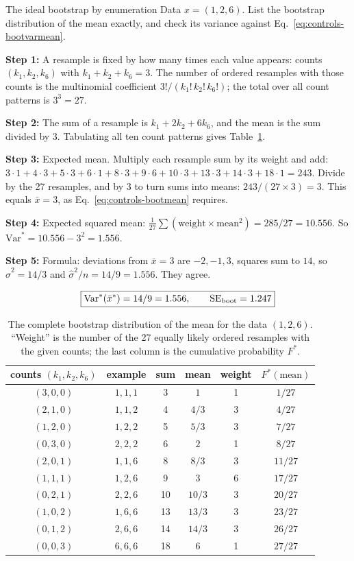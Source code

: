 \begin{sample}{The ideal bootstrap by enumeration}
Data $x=(1,2,6)$. List the bootstrap distribution of the mean exactly, and check its variance against Eq.~\eqref{eq:controls-bootvarmean}.

\textbf{Step 1:} A resample is fixed by how many times each value appears: counts $(k_1,k_2,k_6)$ with $k_1+k_2+k_6=3$. The number of ordered resamples with those counts is the multinomial coefficient $3!/(k_1!\,k_2!\,k_6!)$; the total over all count patterns is $3^3=27$.

\textbf{Step 2:} The sum of a resample is $k_1+2k_2+6k_6$, and the mean is the sum divided by 3. Tabulating all ten count patterns gives Table~\ref{tab:controls-enum}.

\textbf{Step 3:} Expected mean. Multiply each resample sum by its weight and add: $3\cdot1+4\cdot3+5\cdot3+6\cdot1+8\cdot3+9\cdot6+10\cdot3+13\cdot3+14\cdot3+18\cdot1=243$. Divide by the 27 resamples, and by 3 to turn sums into means: $243/(27\times3)=3$. This equals $\bar x=3$, as Eq.~\eqref{eq:controls-bootmean} requires.

\textbf{Step 4:} Expected squared mean: $\frac1{27}\sum(\text{weight}\times\text{mean}^2)=285/27=10.556$. So $\mathrm{Var}^*=10.556-3^2=1.556$.

\textbf{Step 5:} Formula: deviations from $\bar x=3$ are $-2,-1,3$, squares sum to $14$, so $\hat\sigma^2=14/3$ and $\hat\sigma^2/n=14/9=1.556$. They agree.

\[
\boxed{\mathrm{Var}^*(\bar x^*)=14/9=1.556,\qquad \mathrm{SE}_{\rm boot}=1.247}
\]
\end{sample}

\begin{table}[htbp]\centering
\caption{The complete bootstrap distribution of the mean for the data $(1,2,6)$. ``Weight'' is the number of the 27 equally likely ordered resamples with the given counts; the last column is the cumulative probability $F^*$.}\label{tab:controls-enum}
\begin{tabular}{cccccc}
\toprule
counts $(k_1,k_2,k_6)$ & example & sum & mean & weight & $F^*(\text{mean})$\\
\midrule
$(3,0,0)$ & $1,1,1$ & 3 & $1$ & 1 & $1/27$\\
$(2,1,0)$ & $1,1,2$ & 4 & $4/3$ & 3 & $4/27$\\
$(1,2,0)$ & $1,2,2$ & 5 & $5/3$ & 3 & $7/27$\\
$(0,3,0)$ & $2,2,2$ & 6 & $2$ & 1 & $8/27$\\
$(2,0,1)$ & $1,1,6$ & 8 & $8/3$ & 3 & $11/27$\\
$(1,1,1)$ & $1,2,6$ & 9 & $3$ & 6 & $17/27$\\
$(0,2,1)$ & $2,2,6$ & 10 & $10/3$ & 3 & $20/27$\\
$(1,0,2)$ & $1,6,6$ & 13 & $13/3$ & 3 & $23/27$\\
$(0,1,2)$ & $2,6,6$ & 14 & $14/3$ & 3 & $26/27$\\
$(0,0,3)$ & $6,6,6$ & 18 & $6$ & 1 & $27/27$\\
\bottomrule
\end{tabular}
\end{table}

